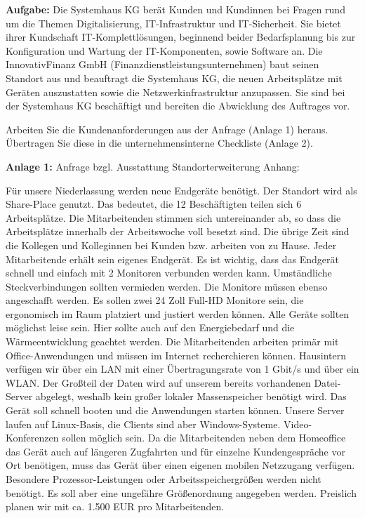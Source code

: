 \documentclass[10pt]{article}
\begin{document}
\begin{flushleft}
\textbf{Aufgabe:}
Die Systemhaus KG berät Kunden und Kundinnen bei Fragen rund um die Themen Digitalisierung, IT-Infrastruktur und IT-Sicherheit. Sie bietet ihrer Kundschaft IT-Komplettlösungen, beginnend beider Bedarfsplanung bis zur Konfiguration und Wartung der IT-Komponenten, sowie Software an.
Die InnovativFinanz GmbH (Finanzdienstleistungsunternehmen) baut seinen Standort aus und beauftragt die Systemhaus KG, die neuen Arbeitsplätze mit Geräten auszustatten sowie die Netzwerkinfrastruktur anzupassen.
Sie sind bei der Systemhaus KG beschäftigt und bereiten die Abwicklung des Auftrages vor.

Arbeiten Sie die Kundenanforderungen aus der Anfrage (Anlage 1) heraus. Übertragen Sie diese in die unternehmensinterne Checkliste (Anlage 2).

\textbf{Anlage 1:}
Anfrage bzgl. Ausstattung Standorterweiterung Anhang:

Für unsere Niederlassung werden neue Endgeräte benötigt. Der Standort wird als Share-Place genutzt. Das bedeutet, die
12 Beschäftigten teilen sich 6 Arbeitsplätze. Die Mitarbeitenden stimmen sich untereinander ab, so dass die Arbeitsplätze innerhalb der Arbeitswoche voll besetzt sind. Die übrige Zeit sind die Kollegen und Kolleginnen bei Kunden bzw. arbeiten von zu Hause. Jeder Mitarbeitende erhält sein eigenes Endgerät.
Es ist wichtig, dass das Endgerät schnell und einfach mit 2 Monitoren verbunden werden kann. Umständliche Steckverbindungen sollten vermieden werden. Die Monitore müssen
ebenso angeschafft werden. Es sollen zwei 24 Zoll Full-HD Monitore sein, die ergonomisch im Raum platziert und justiert werden können. Alle Geräte sollten möglichst leise sein. Hier sollte auch auf den Energiebedarf und die Wärmeentwicklung geachtet werden.
Die Mitarbeitenden arbeiten primär mit Office-Anwendungen und müssen im Internet recherchieren können. Hausintern verfügen wir über ein LAN mit einer Übertragungsrate von
1 Gbit/s und über ein WLAN. Der Großteil der Daten wird auf unserem bereits vorhandenen Datei-Server abgelegt, weshalb kein großer lokaler Massenspeicher benötigt wird. Das Gerät soll schnell booten und die Anwendungen starten können. Unsere Server laufen auf Linux-Basis, die Clients sind aber Windows-Systeme. Video-Konferenzen sollen möglich sein.
Da die Mitarbeitenden neben dem Homeoffice das Gerät auch auf längeren Zugfahrten und für einzelne Kundengespräche vor Ort benötigen, muss das Gerät über einen eigenen mobilen Netzzugang verfügen. Besondere Prozessor-Leistungen oder Arbeitsspeichergrößen werden nicht benötigt. Es soll aber eine ungefähre Größenordnung angegeben werden.
Preislich planen wir mit ca. 1.500 EUR pro Mitarbeitenden.


\end{flushleft}
\end{document}
